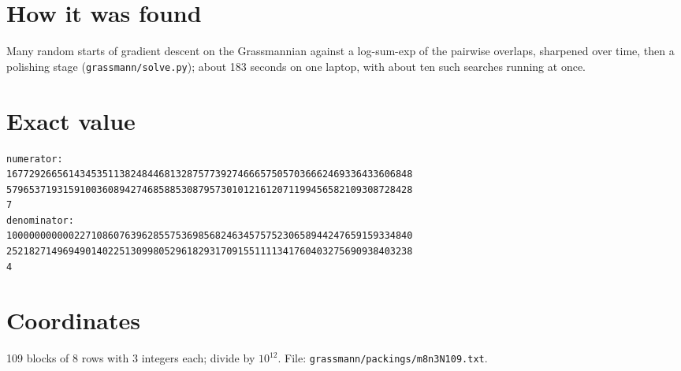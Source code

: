 \documentclass[11pt,a4paper]{article}
\begin{document}
\section{How it was found}
Many random starts of gradient descent on the Grassmannian against a log-sum-exp of the pairwise overlaps, sharpened over time, then a polishing stage (\texttt{grassmann/solve.py}); about 183 seconds on one laptop, with about ten such searches running at once.


\appendix
\section{Exact value}
{\small
\begin{verbatim}
numerator:
167729266561434535113824844681328757739274666575057036662469336433606848
579653719315910036089427468588530879573010121612071199456582109308728428
7
denominator:
100000000000227108607639628557536985682463457575230658944247659159334840
252182714969490140225130998052961829317091551111341760403275690938403238
4
\end{verbatim}}

\section{Coordinates}
109 blocks of 8 rows with 3 integers each; divide by $10^{12}$. File: \texttt{grassmann/packings/m8n3N109.txt}.
{\tiny
\begin{multicols}{3}
\end{multicols}}
\end{document}
